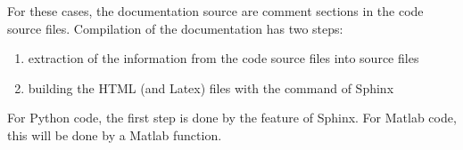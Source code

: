 \documentclass[letterpaper,10pt,english]{sphinxmanual}
\begin{document}
For these cases, the documentation source are comment sections in the code source files. Compilation of the documentation has two steps:
\begin{enumerate}
%
\item {} 
extraction of the information from the code source files into  source files

\item {} 
building the HTML (and Latex) files with the  command of Sphinx

\end{enumerate}

For Python code, the first step is done by the  feature of Sphinx. For Matlab code, this will be done by a Matlab function.



\renewcommand{\indexname}{Index}
\printindex
\end{document}
